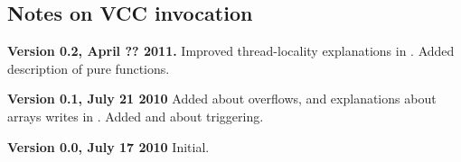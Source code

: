 \subsection{Notes on VCC invocation}
\label{sect:todo-invoke}


\noindent \textbf{Version 0.2, April ?? 2011.}
Improved thread-locality explanations in .
Added description of pure functions.

\noindent \textbf{Version 0.1, July 21 2010}
Added  about overflows, and explanations about arrays writes in .
Added  and  about triggering.

\noindent \textbf{Version 0.0, July 17 2010}
Initial.

% 
%
